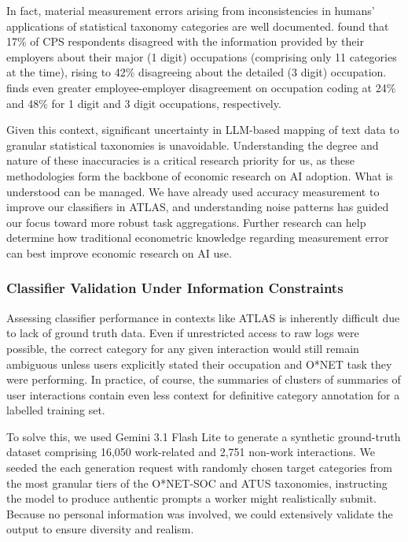 \documentclass[11pt,a4paper]{article}
\begin{document}
In fact, material measurement errors arising from inconsistencies in humans’ applications of statistical taxonomy categories are well documented. \cite{mellow1983} found that 17\% of CPS respondents disagreed with the information provided by their employers about their major (1 digit) occupations (comprising only 11 categories at the time), rising to 42\% disagreeing about the detailed (3 digit) occupation. \cite{10.1086/269327} finds even greater employee-employer disagreement on occupation coding at 24\% and 48\% for 1 digit and 3 digit occupations, respectively.

Given this context, significant uncertainty in LLM-based mapping of text data to granular statistical taxonomies is unavoidable. Understanding the degree and nature of these inaccuracies is a critical research priority for us, as these methodologies form the backbone of economic research on AI adoption. What is understood can be managed. We have already used accuracy measurement to improve our classifiers in ATLAS, and understanding noise patterns has guided our focus toward more robust task aggregations. Further research can help determine how traditional econometric knowledge regarding measurement error \citep[e.g.,][]{Bound2001} can best improve economic research on AI use.

\subsubsection{Classifier Validation Under Information Constraints}
Assessing classifier performance in contexts like ATLAS is inherently difficult due to lack of  ground truth data. Even if unrestricted access to raw logs were possible, the correct category for any given interaction would still remain ambiguous unless users explicitly stated their occupation and O*NET task they were performing. In practice, of course, the summaries of clusters of summaries of user interactions contain even less context for definitive category annotation for a labelled training set. 

To solve this, we used Gemini 3.1 Flash Lite to generate a synthetic ground-truth dataset comprising 16,050 work-related and 2,751 non-work interactions. We seeded the each generation request with randomly chosen target categories from the most granular tiers of the O*NET-SOC and ATUS taxonomies, instructing the model to produce authentic prompts a worker might realistically submit. Because no personal information was involved, we could extensively validate the output to ensure diversity and realism.
\end{document}

